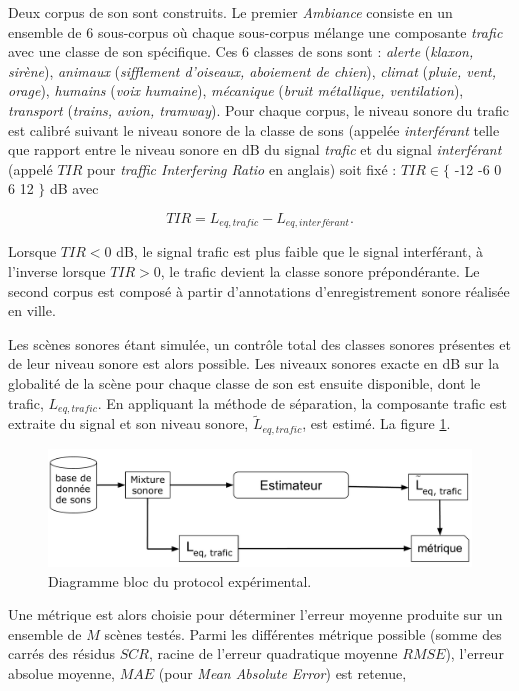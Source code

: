 Deux corpus de son sont construits. Le premier \textit{Ambiance} consiste en un ensemble de 6 sous-corpus où chaque sous-corpus mélange une composante \textit{trafic} avec une classe de son spécifique. Ces 6 classes de sons sont : \textit{alerte} (\textit{klaxon, sirène}), \textit{animaux} (\textit{sifflement d'oiseaux, aboiement de chien}), \textit{climat} (\textit{pluie, vent, orage}), \textit{humains} (\textit{voix humaine}), \textit{mécanique} (\textit{bruit métallique, ventilation}), \textit{transport} (\textit{trains, avion, tramway}). Pour chaque corpus, le niveau sonore du trafic est calibré suivant le niveau sonore de la classe de sons (appelée \textit{interférant} telle que rapport entre le niveau sonore en dB du signal \textit{trafic} et du signal \textit{interférant} (appelé $TIR$ pour \textit{traffic Interfering Ratio} en anglais) soit fixé : $TIR \in \lbrace$ -12 -6 0 6 12 $\rbrace$ dB avec 

\begin{equation}
TIR = L_{eq,trafic} - L_{eq,interférant}.
\end{equation}

Lorsque $TIR < 0$ dB, le signal trafic est plus faible que le signal interférant, à l'inverse lorsque $TIR>0$, le trafic devient la classe sonore prépondérante.
Le second corpus est composé à partir d'annotations d'enregistrement sonore réalisée en ville. 


Les scènes sonores étant simulée, un contrôle total des classes sonores présentes et de leur niveau sonore est alors possible. Les niveaux sonores exacte en dB sur la globalité de la scène pour chaque classe de son est ensuite disponible, dont le trafic, $L_{eq,trafic}$. En appliquant la méthode de séparation, la composante trafic est extraite du signal et son niveau sonore, $\tilde{L}_{eq,trafic}$, est estimé. La figure \ref{fig:diagramBlocProtocol}.

\begin{figure}[t]
\centering
\includegraphics[width=0.7\linewidth]{./figures/NMF/Bloc_diagram_estimateur_FR.pdf}
\caption{Diagramme bloc du protocol expérimental.}
\label{fig:diagramBlocProtocol}
\end{figure}


Une métrique est alors choisie pour déterminer l'erreur moyenne produite sur un ensemble de $M$ scènes testés. Parmi les différentes métrique possible (somme des carrés des résidus $SCR$, racine de l'erreur quadratique moyenne $RMSE$), l'erreur absolue moyenne, $MAE$ (pour \textit{Mean Absolute Error}) est retenue,  


